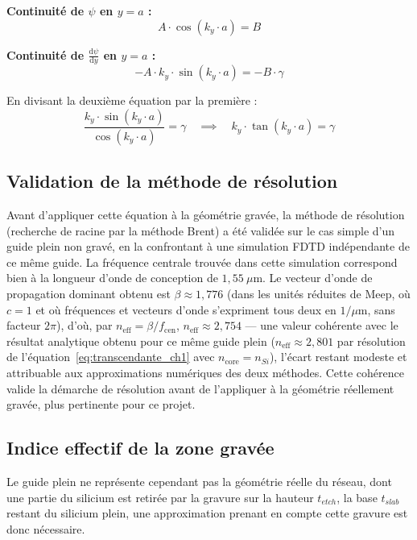 \documentclass[a4paper,11pt]{report}
\begin{document}
\vspace{0.5em}
\noindent \textbf{Continuité de $\psi$ en $y=a$ :}
\begin{equation}
A \cdot \cos(k_y \cdot a) = B
\end{equation}

\noindent \textbf{Continuité de $\frac{\text{d}\psi}{\text{d}y}$ en $y=a$ :}
\begin{equation}
-A \cdot k_y \cdot \sin(k_y \cdot a) = -B \cdot \gamma
\end{equation}

En divisant la deuxième équation par la première :
\begin{equation}
\frac{k_y \cdot \sin(k_y \cdot a)}{\cos(k_y \cdot a)} = \gamma \quad \implies \quad k_y \cdot \tan(k_y \cdot a) = \gamma
\label{eq:transcendante_ch1}
\end{equation}

\subsection*{Validation de la méthode de résolution}

Avant d'appliquer cette équation à la géométrie gravée, la méthode de résolution (recherche de racine par la méthode Brent) a été validée sur le cas simple d'un guide plein non gravé, en la confrontant à une simulation FDTD indépendante de ce même guide. La fréquence centrale trouvée dans cette simulation correspond bien à la longueur d'onde de conception de $1{,}55~\mu\text{m}$. Le vecteur d'onde de propagation dominant obtenu est $\beta \approx 1{,}776$ (dans les unités réduites de Meep, où $c=1$ et où fréquences et vecteurs d'onde s'expriment tous deux en $1/\mu\text{m}$, sans facteur $2\pi$), d'où, par $n_{\text{eff}} = \beta/f_{\text{cen}}$, $n_{\text{eff}} \approx 2{,}754$ --- une valeur cohérente avec le résultat analytique obtenu pour ce même guide plein ($n_{\text{eff}}\approx2{,}801$ par résolution de l'équation~\eqref{eq:transcendante_ch1} avec $n_{\text{core}}=n_{Si}$), l'écart restant modeste et attribuable aux approximations numériques des deux méthodes. Cette cohérence valide la démarche de résolution avant de l'appliquer à la géométrie réellement gravée, plus pertinente pour ce projet.

\subsection*{Indice effectif de la zone gravée}

Le guide plein ne représente cependant pas la géométrie réelle du réseau, dont une partie du silicium est retirée par la gravure sur la hauteur $t_{etch}$, la base $t_{slab}$ restant du silicium plein, une approximation prenant en compte cette gravure est donc nécessaire.
\end{document}

